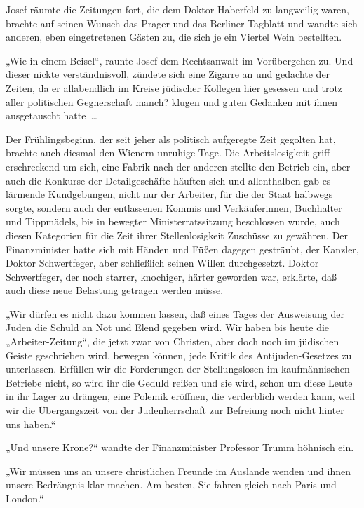 Josef räumte die Zeitungen fort, die dem Doktor Haberfeld zu
langweilig waren, brachte auf seinen Wunsch das Prager und das
Berliner Tagblatt und wandte sich  anderen, eben
eingetretenen Gästen zu, die sich je ein Viertel Wein bestellten.

„Wie in einem Beisel“, raunte Josef dem Rechtsanwalt im
Vorübergehen zu. Und dieser nickte verständnisvoll, zündete sich
eine Zigarre an und gedachte der Zeiten, da er allabendlich im
Kreise jüdischer Kollegen hier gesessen und trotz aller politischen
Gegnerschaft manch? klugen und guten Gedanken mit ihnen
ausgetauscht hatte~\ldots{}

\tb{* * *}
Der Frühlingsbeginn, der seit jeher als politisch aufgeregte Zeit
gegolten hat, brachte auch diesmal den Wienern unruhige Tage. Die
Arbeitslosigkeit griff erschreckend um sich, eine Fabrik nach der
anderen stellte den Betrieb ein, aber auch die Konkurse der
Detailgeschäfte häuften sich und allenthalben gab es lärmende
Kundgebungen, nicht nur der Arbeiter, für die der Staat halbwegs
sorgte, sondern auch der entlassenen Kommis und Verkäuferinnen,
Buchhalter und Tippmädels, bis in bewegter Ministerratssitzung
beschlossen wurde, auch diesen Kategorien für die Zeit ihrer
Stellenlosigkeit Zuschüsse zu gewähren. Der Finanzminister hatte
sich mit Händen und Füßen dagegen gesträubt, der Kanzler, Doktor
Schwertfeger, aber schließlich seinen Willen durchgesetzt. Doktor
Schwertfeger, der noch starrer, knochiger, härter geworden war,
erklärte, daß auch diese neue Belastung getragen werden müsse.

„Wir dürfen es nicht dazu kommen lassen, daß eines Tages der
Ausweisung der Juden die Schuld an Not und  Elend
gegeben wird. Wir haben bis heute die „Arbeiter-Zeitung“, die jetzt
zwar von Christen, aber doch noch im jüdischen Geiste geschrieben
wird, bewegen können, jede Kritik des Antijuden-Gesetzes zu
unterlassen. Erfüllen wir die Forderungen der Stellungslosen im
kaufmännischen Betriebe nicht, so wird ihr die Geduld reißen und
sie wird, schon um diese Leute in ihr Lager zu drängen, eine
Polemik eröffnen, die verderblich werden kann, weil wir die
Übergangszeit von der Judenherrschaft zur Befreiung noch nicht
hinter uns haben.“

„Und unsere Krone?“ wandte der Finanzminister Professor Trumm
höhnisch ein.

„Wir müssen uns an unsere christlichen Freunde im Auslande wenden
und ihnen unsere Bedrängnis klar machen. Am besten, Sie fahren
gleich nach Paris und London.“

